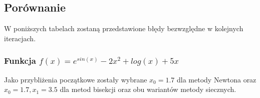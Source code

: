\documentclass[11pt,wide]{article}
\begin{document}
\subsection{Porównanie}
W poniższych tabelach zostaną przedstawione błędy bezwzględne w kolejnych iteracjach.
\subsubsection{Funkcja $f(x) = e^{sin(x)} - 2x^2 + log(x) + 5x$}

\begin{center}
\end{center}
\noindent
Jako przybliżenia początkowe zostały wybrane $x_0 = 1.7$ dla metody Newtona oraz $x_0 = 1.7 , x_1 = 3.5$ dla metod bisekcji oraz obu wariantów metody siecznych.
\end{document}
